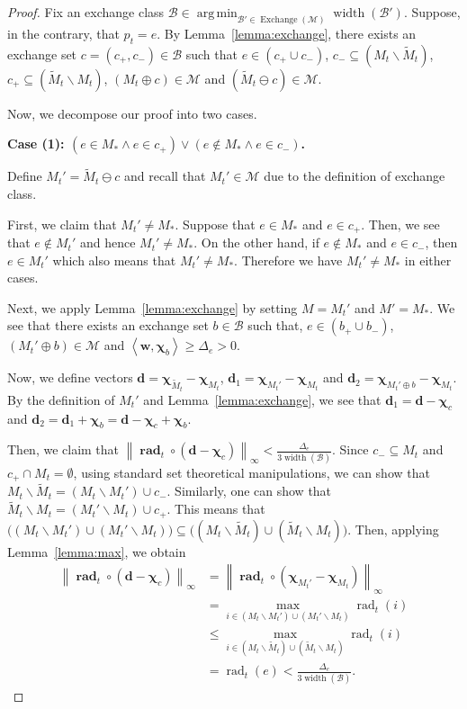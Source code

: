 \documentclass{article}
\newcommand{\M}{\mathcal M}
\newcommand{\B}{\mathcal B}
\newcommand{\del}{\backslash}
\DeclareMathOperator{\rank}{width}
\DeclareMathOperator{\rad}{rad}
\DeclareMathOperator*{\argmin}{arg\,min}
\DeclareMathOperator{\Exchange}{Exchange}
\newcommand{\inn}[1]{\left\langle #1 \right\rangle}
\newcommand{\nor}[1]{\left\|#1\right\|}
\renewcommand{\vec}[1]{\boldsymbol{#1}}
\renewcommand{\odot}{\circ}
\begin{document}
\begin{proof}
Fix an exchange class $\B\in \argmin_{\B'\in \Exchange(\M)} \rank(\B')$.
Suppose, in the contrary, that $p_t = e$.
By Lemma~\ref{lemma:exchange}, there exists an exchange set $c=(c_+,c_-) \in \B$
such that $e\in (c_+\cup c_-)$, $c_- \subseteq (M_t \del \tilde M_t)$, $c_+ \subseteq (\tilde M_t \del M_t)$, $(M_t\oplus c) \in \M$ and $(\tilde M_t \ominus c) \in \M$.


Now, we decompose our proof into two cases.

\textbf{Case (1): $(e \in M_* \wedge e\in c_+) \vee (e \not \in M_* \wedge e\in c_-)$.}

Define $M_t' = \tilde M_t \ominus c$ and recall that $M_t' \in \M$ due to the definition of exchange class.

First, we claim that $M_t'\not= M_*$.
Suppose that $e\in M_*$ and $e\in c_+$.
Then, we see that $e\not\in M_t'$ and hence $M_t'\not=M_*$.
On the other hand, if $e\not \in M_*$ and $e\in c_-$, then $e\in M_t'$ which also means that $M_t'\not= M_*$.
Therefore we have $M_t'\not=M_*$ in either cases.


Next, we apply Lemma~\ref{lemma:exchange} by setting $M=M_t'$ and $M'=M_*$.
We see that there exists an exchange set $b\in \B$ such that, $e\in (b_+\cup b_-)$, $(M_t' \oplus b) \in \M$ and
 $\inn{\vec w, \vec \chi_b} \ge \Delta_e > 0$.
 
Now, we define vectors $\vec d = \vec \chi_{\tilde M_t} - \vec \chi_{M_t}$, $\vec d_1 = \vec\chi_{M_t'}-\vec\chi_{M_t}$ and $\vec d_2 = \vec\chi_{M_t'\oplus b}-\vec\chi_{M_t}$.
By the definition of $M_t'$ and Lemma~\ref{lemma:exchange}, we see that $\vec d_1 = \vec d - \vec \chi_{c}$ and $\vec d_2 = \vec d_1+\vec \chi_b = \vec d-\vec \chi_c+\vec \chi_b$.


Then, we claim that $\nor{\vec \rad_t \odot (\vec d-\vec \chi_c)}_\infty < \frac{\Delta_e}{3\rank(\B)}$.
Since $c_-\subseteq M_t$ and $c_+\cap M_t = \emptyset$, using standard set theoretical manipulations, we can show that $M_t \del \tilde M_t= (M_t \del M_t') \cup c_-$. 
Similarly, one can show that $\tilde M_t \del M_t = (M_t' \del M_t) \cup c_+$. 
This means that $\big((M_t \del M_t') \cup (M_t'\del M_t)\big) \subseteq \big((M_t \del \tilde M_t ) \cup (\tilde M_t \del M_t)\big)$.
Then, applying Lemma~\ref{lemma:max}, we obtain
\begin{align}
   \nor{\vec \rad_t \odot (\vec d-\vec\chi_c)}_\infty 
   &= \nor{\vec \rad_t \odot (\vec \chi_{M_t'} - \vec\chi_{M_t})}_\infty \nonumber\\
   &= \max_{i\in (M_t \del M_t') \cup (M_t'\del M_t) } \rad_t(i) \nonumber \\
   &\le \max_{i\in (M_t \del \tilde M_t ) \cup (\tilde M_t \del M_t)}  \rad_t(i) \nonumber \\
   & = \rad_t(e) < \frac{\Delta_e}{3\rank(\B)} \label{eq:u-c-1-0}.
\end{align}


\end{proof}
\end{document}
